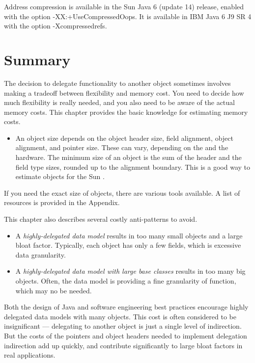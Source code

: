 Address compression is available in the Sun Java 6 (update 14) release, enabled with the option -XX:+UseCompressedOops. It is available in IBM Java 6 J9 SR 4 with the option -Xcompressedrefs.

\section{Summary}

The decision to delegate functionality to another object sometimes involves making a tradeoff between flexibility and memory cost. You need to decide how much flexibility is really needed, and you also need to be aware of the actual memory costs. This chapter provides the basic knowledge for estimating memory costs. 
\begin{itemize}
\item An object size depends on the object header size, field alignment, object
alignment, and pointer size. These can vary, depending on the \jre and the
hardware. The minimum size of an object is the sum of the header and the field
type sizes, rounded up to the alignment boundary. This is a good way to
estimate objects for the Sun \jre.
\end{itemize}
If you need the exact size of objects, there are various tools available. A list of resources is provided in the Appendix.

This chapter also describes several costly anti-patterns to avoid.
\begin{itemize}
\item A \textit{highly-delegated data model} results in too many small objects and a large bloat factor. Typically, each object has only a few fields, which is excessive data granularity.  
\item A \textit{highly-delegated data model with large base classes} results in too many big objects. Often, the data model is providing a fine granularity of function, which may no be needed.
\end{itemize}   

Both the design of Java and software engineering best practices encourage highly delegated data models with many objects. This cost is often considered to be insignificant --- delegating to another object is just a single level of indirection. But the costs of the pointers and object headers needed to implement delegation indirection add up quickly, and contribute significantly to large bloat factors in real applications. 

  

